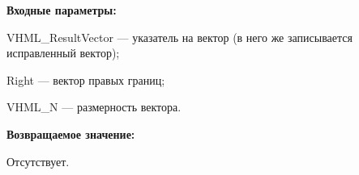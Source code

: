 \textbf{Входные параметры:}  
 
VHML\_ResultVector --- указатель на вектор (в него же записывается исправленный вектор);
 
Right --- вектор правых границ;
 
VHML\_N --- размерность вектора.

\textbf{Возвращаемое значение:}

Отсутствует.